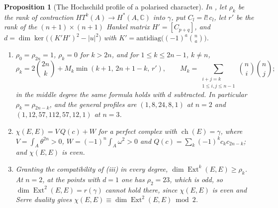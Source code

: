 \documentclass[11pt,reqno]{amsart}
\theoremstyle{plain}
\newtheorem{proposition}[theorem]{Proposition}
\theoremstyle{definition}
\theoremstyle{remark}
\newcommand{\CC}{\mathbb{C}}
\DeclareMathOperator{\ch}{ch}
\DeclareMathOperator{\Ext}{Ext}
\begin{document}
\begin{proposition}[The Hochschild profile of a polarised character]
\label{prop:p2primeprofile}
In , let $\rho_{k}$ be the rank of contraction
$HT^{k}(A)\to H^{*}(A,\CC)$ into $\gamma$, put $C_{l}=l!\,c_{l}$, let
$r'$ be the rank of the $(n+1)\times(n+1)$ Hankel matrix $H'=[C_{p+q}]$, and
$d=\dim\ker\bigl((K'H')^{2}-|u|^{2}\bigr)$ with
$K'=\mathrm{antidiag}\bigl((-1)^{a}\binom{n}{a}\bigr)$.
\begin{enumerate}[label=\textup{(\roman*)},leftmargin=2.6em,itemsep=2pt]
\item $\rho_{0}=\rho_{2n}=1$, $\rho_{k}=0$ for $k>2n$, and for
  $1\le k\le2n-1$, $k\ne n$,
  \[
    \rho_{k}=2\binom{2n}{k}+M_{k}\min(k+1,\,2n+1-k,\,r'),\qquad
    M_{k}=\sum_{\substack{i+j=k\\1\le i,j\le n-1}}\binom{n}{i}\binom{n}{j};
  \]
  in the middle degree the same formula holds with $d$ subtracted. In particular $\rho_{k}=\rho_{2n-k}$, and the general
  profiles are $(1,8,24,8,1)$ at $n=2$ and $(1,12,57,112,57,12,1)$ at
  $n=3$.
\item $\chi(E,E)=V\,Q(c)+W$ for a perfect complex with $\ch(E)=\gamma$, where
  $V=\int_{A}\theta^{2n}>0$, $W=(-1)^{n}\int_{A}\omega^{2}>0$ and
  $Q(c)=\sum_{k}(-1)^{k}c_{k}c_{2n-k}$; and $\chi(E,E)$ is even.
\item Granting the compatibility of (iii) in every degree,
  $\dim\Ext^{k}(E,E)\ge\rho_{k}$. At $n=2$, at the points with $d=1$ one has
  $\rho_{2}=23$, which is odd, so $\dim\Ext^{2}(E,E)=r(\gamma)$ cannot hold
  there, since $\chi(E,E)$ is even and Serre duality gives
  $\chi(E,E)\equiv\dim\Ext^{2}(E,E)\bmod2$.
\end{enumerate}
\end{proposition}
\end{document}

